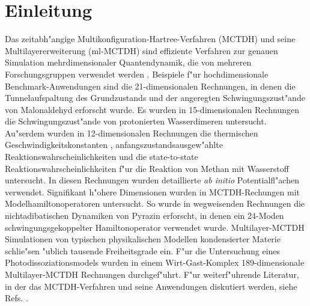 \chapter{Einleitung}
\label{ch:einleitung}

Das zeitabh"angige Multikonfiguration-Hartree-Verfahren (MCTDH) 
\cite{MMC, MMC1} und seine Multilayererweiterung (ml-MCTDH)
\cite{WT3, Mreview2} 
sind effiziente Verfahren zur genauen Simulation mehrdimensionaler Quantendynamik,
die von mehreren Forschungsgruppen verwendet werden 
\cite{MCTDHex1, WestPNM, MCTDHex2, W1, MCTDHex4, MCTDHex5, MCTDHex6, MCTDHex7, MCTDHex8,
MCTDHex9, MCTDHex10, MCTDHex11, MCTDHex12, MCTDHex13, MCTDHex14, MCTDHex15, MCTDHex16, MCTDHex17,MCTDHex18}. 
Beispiele f"ur hochdimensionale 
Benchmark-Anwendungen sind die 21-dimen\-sio\-nalen Rechnungen, in denen die Tunnelaufspaltung des
Grundzustands \cite{CVM, HCVM, HaM1, MAMCTDH, HaM2, MAMCTDH2} und der angeregten \cite{HCVM, HaM1, MAMCTDH, HaM2, MAMCTDH2}
Schwingungszust"ande von Malonaldehyd erforscht wurde. 
Es wurden in 15-dimen\-sio\-nalen Rechnungen die Schwingungszust"ande von protonierten 
Wasserdi\-meren  \cite{H5O2+MCTDH, H5O2+MCTDH2, H5O2+MCTDH3, H5O2+MCTDH4, H5O2+MCTDH5} untersucht. 
Au"serdem wurden in 12-dimensionalen Rechnungen die thermischen 
Geschwindig\-keitskonstanten \cite{HM1, HM2, WWM, SM, vHNM,NvHM}, anfangszustandsausgew"ahlte Reaktionswahr\-scheinlichkeiten
\cite{SM02, SM04, WeM5, WeM6, WeM8} und die 
state-to-state Reaktionswahrscheinlichkeiten \cite{WeM7} f"ur die Reaktion von Methan mit Wasserstoff 
untersucht. In diesen Rechnungen wurden detaillierte \textit{ab initio} 
Potentialfl"achen verwendet. Signifikant h"ohere Dimensionen wurden in MCTDH-Rechungen mit 
Modelhamiltonoperatoren untersucht. So wurde in wegweisenden Rechnungen  
die nichtadibatischen Dynamiken von Pyrazin erforscht, in denen ein 24-Moden 
schwingungsgekoppelter Hamiltonoperator \cite{WMC, WMC2, RWMC} verwendet wurde.
Multilayer-MCTDH Simulationen von typischen
physikalischen Modellen \cite{WT3, W1, WST, KCBWT, CTW2, WPHT} kondensierter Materie schlie"sen "ublich tausende Freiheitsgrade ein.
F"ur die Untersuchung eines Photodissoziationsmodels wurden in einem Wirt-Gast-Komplex 189-dimensionale 
Multilayer-MCTDH Rechnungen  durchgef"uhrt\cite{WBRSM}. 
F"ur weiterf"uhrende Literatur, in der das MCTDH-Verfahren und seine Anwendungen diskutiert
werden, siehe Refs. \cite{MCTDHreview, MCTDHreview2, HMreview1, MCTDHbook,Mreview2011, MCTDHreview3}.

